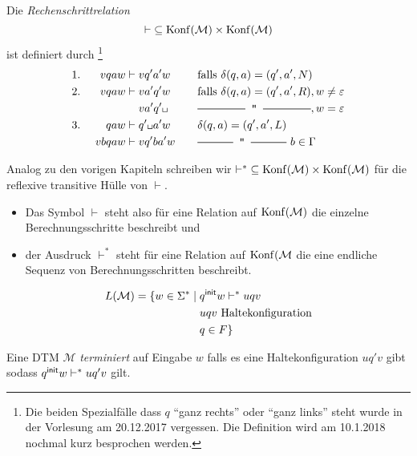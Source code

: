 \begin{Def}[name={[Rechenschrittrelation]}] %
	Die \emph{Rechenschrittrelation}
	\[ {\vdash} \subseteq \operatorname{Konf}(\mathcal{M})\times\operatorname{Konf}(\mathcal{M}) \]
	ist definiert durch
	\footnote{Die beiden Spezialfälle dass $q$ ``ganz rechts'' oder ``ganz links'' steht wurde in der Vorlesung am 20.12.2017 vergessen. Die Definition wird am 10.1.2018 nochmal kurz besprochen werden.}
	\begin{alignat*}{3}
		1.&\ & v qaw &\vdash v q'a'w &\quad& \text{falls }\delta(q,a)=(q',a',N)\\
		2.&& v qaw &\vdash v a'q'w && \text{falls }\delta(q,a)=(q',a',R), w\neq \Eps\\
		&&&\phantom{{}\vdash{}} v a'q'\blank && \ruleplaceholder{\widthof{falls $\delta(q,a)=(q',a',R)$}}, w=\Eps\\
		3.&& qaw &\vdash q'\blank a'w && \delta(q,a)=(q',a',L)\\
		&& vbqaw &\vdash vq'ba'w && \ruleplaceholder{\widthof{$\delta(q,a)=(q',a',L)$}}\  b\in\Gamma
	\end{alignat*}
\end{Def}
Analog zu den vorigen Kapiteln schreiben wir
	${\vdash^*} \subseteq \operatorname{Konf}(\mathcal{M}) \times \operatorname{Konf}(\mathcal{M})$ 
	für die reflexive transitive Hülle von $\vdash$.
\begin{itemize}
 \item Das Symbol $\vdash$ steht also für eine Relation auf $\operatorname{Konf}(\mathcal{M})$ die einzelne Berechnungsschritte beschreibt und
 \item der Ausdruck $\vdash^*$ steht für eine Relation auf $\operatorname{Konf}(\mathcal{M}$ die eine endliche Sequenz von  Berechnungsschritten beschreibt.
\end{itemize}

 
%
%
\begin{Def} %
	\begin{align*}
		L(\mathcal{M})=\{ w\in\Sigma^* \mid{}
		& q^\mathsf{init} w \vdash^*uqv\\
		&uqv \text{ Haltekonfiguration}\\
		&q\in F\}
	\end{align*}
\end{Def}


\begin{Def}[name={[Terminierung]}]
 Eine \ac{DTM} $\mathcal{M}$ \emph{terminiert} auf Eingabe $w$ 
 falls es eine Haltekonfiguration $uq'v$ gibt sodass $q^\mathsf{init} w\vdash^*uq'v$ gilt.
\end{Def}

